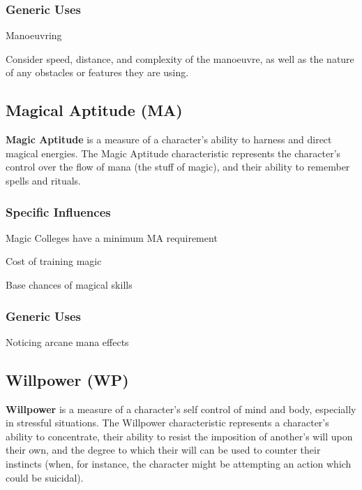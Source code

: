 \begin{multicols*}{3}
\subsubsection{Generic Uses}
\begin{Itemize}
\item Manoeuvring
\end{Itemize}
\begin{example}
Consider speed, distance, and complexity of the manoeuvre, as well as
the nature of any obstacles or features they are using.
\end{example}

\subsection{Magical Aptitude (MA)}

\textbf{Magic Aptitude} is a measure of a character's ability to
harness and direct magical energies.  The Magic Aptitude
characteristic represents the character's control over the flow of
mana (the stuff of magic), and their ability to remember spells and
rituals.
\subsubsection{Specific Influences}
\begin{Itemize}
\item Magic Colleges have a minimum MA requirement
\item Cost of training magic
\item Base chances of magical skills
\end{Itemize}
\subsubsection{Generic Uses}
\begin{Itemize}
\item Noticing arcane mana effects
\end{Itemize}

\subsection{Willpower (WP)}

\textbf{Willpower} is a measure of a character's self control of mind
and body, especially in stressful situations.  The Willpower
characteristic represents a character's ability to concentrate, their
ability to resist the imposition of another's will upon their own, and
the degree to which their will can be used to counter their instincts
(when, for instance, the character might be attempting an action which
could be suicidal).


\end{multicols*}
